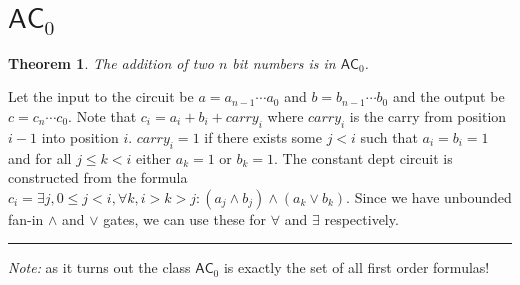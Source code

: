 \documentclass[twoside]{article}
\newcounter{lecnum}
\newtheorem{theorem}{Theorem}[lecnum]
\newenvironment{proof}{{\bf Proof:}}{\hfill\rule{2mm}{2mm}}
\def\AC{\mathsf{AC}}
\begin{document}
\section{$\AC_0$}
\begin{theorem}
The addition of two $n$ bit numbers is in $\AC_0$.
\end{theorem}
\begin{proof}
Let the input to the circuit be $a = a_{n-1}\cdots a_0$ and $b = b_{n-1}\cdots b_0$ and the output be $c = c_{n}\cdots c_0$. Note that $c_i = a_i + b_i + carry_i$ where $carry_i$ is the carry from position $i-1$ into position $i$. $carry_i = 1$ if there exists some $j < i$ such that $a_i = b_i = 1$ and for all $j \leq k < i$ either $a_k = 1$ or $b_k = 1$. The constant dept circuit is constructed from the formula $c_i = \exists j, 0 \leq j < i, \forall k, i > k > j: (a_j \land b_j) \land (a_k \lor b_k)$. Since we have unbounded fan-in $\land$ and $\lor$ gates, we can use these for $\forall$ and $\exists$ respectively.
\end{proof}

\emph{Note: } as it turns out the class $\AC_0$ is exactly the set of all first order formulas! 
\end{document}

